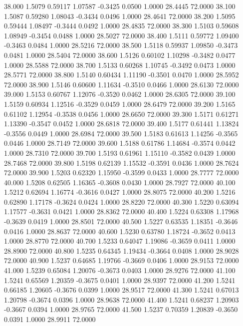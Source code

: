   38.000   1.5079   0.59117   1.07587  -0.3425   0.0500   1.0000  28.4445  72.0000
  38.100   1.5087   0.59280   1.08043  -0.3434   0.0496   1.0000  28.4641  72.0000
  38.200   1.5095   0.59444   1.08497  -0.3444   0.0492   1.0000  28.4835  72.0000
  38.300   1.5103   0.59608   1.08949  -0.3454   0.0488   1.0000  28.5027  72.0000
  38.400   1.5111   0.59772   1.09400  -0.3463   0.0484   1.0000  28.5216  72.0000
  38.500   1.5118   0.59937   1.09850  -0.3473   0.0481   1.0000  28.5404  72.0000
  38.600   1.5126   0.60102   1.10298  -0.3482   0.0477   1.0000  28.5588  72.0000
  38.700   1.5133   0.60268   1.10745  -0.3492   0.0473   1.0000  28.5771  72.0000
  38.800   1.5140   0.60434   1.11190  -0.3501   0.0470   1.0000  28.5952  72.0000
  38.900   1.5146   0.60600   1.11634  -0.3510   0.0466   1.0000  28.6130  72.0000
  39.000   1.5153   0.60767   1.12076  -0.3520   0.0462   1.0000  28.6305  72.0000
  39.100   1.5159   0.60934   1.12516  -0.3529   0.0459   1.0000  28.6479  72.0000
  39.200   1.5165   0.61102   1.12954  -0.3538   0.0456   1.0000  28.6650  72.0000
  39.300   1.5171   0.61271   1.13390  -0.3547   0.0452   1.0000  28.6818  72.0000
  39.400   1.5177   0.61441   1.13824  -0.3556   0.0449   1.0000  28.6984  72.0000
  39.500   1.5183   0.61613   1.14256  -0.3565   0.0446   1.0000  28.7149  72.0000
  39.600   1.5188   0.61786   1.14684  -0.3574   0.0442   1.0000  28.7310  72.0000
  39.700   1.5193   0.61961   1.15110  -0.3582   0.0439   1.0000  28.7468  72.0000
  39.800   1.5198   0.62139   1.15532  -0.3591   0.0436   1.0000  28.7624  72.0000
  39.900   1.5203   0.62320   1.15950  -0.3599   0.0433   1.0000  28.7777  72.0000
  40.000   1.5208   0.62505   1.16365  -0.3608   0.0430   1.0000  28.7927  72.0000
  40.100   1.5212   0.62694   1.16774  -0.3616   0.0427   1.0000  28.8075  72.0000
  40.200   1.5216   0.62890   1.17178  -0.3624   0.0424   1.0000  28.8220  72.0000
  40.300   1.5220   0.63094   1.17577  -0.3631   0.0421   1.0000  28.8362  72.0000
  40.400   1.5224   0.63308   1.17968  -0.3639   0.0419   1.0000  28.8501  72.0000
  40.500   1.5227   0.63535   1.18351  -0.3646   0.0416   1.0000  28.8637  72.0000
  40.600   1.5230   0.63780   1.18724  -0.3652   0.0413   1.0000  28.8770  72.0000
  40.700   1.5233   0.64047   1.19086  -0.3659   0.0411   1.0000  28.8900  72.0000
  40.800   1.5235   0.64345   1.19434  -0.3664   0.0408   1.0000  28.9028  72.0000
  40.900   1.5237   0.64685   1.19766  -0.3669   0.0406   1.0000  28.9153  72.0000
  41.000   1.5239   0.65084   1.20076  -0.3673   0.0403   1.0000  28.9276  72.0000
  41.100   1.5241   0.65569   1.20359  -0.3675   0.0401   1.0000  28.9397  72.0000
  41.200   1.5241   0.66185   1.20605  -0.3676   0.0399   1.0000  28.9517  72.0000
  41.300   1.5241   0.67013   1.20798  -0.3674   0.0396   1.0000  28.9638  72.0000
  41.400   1.5241   0.68237   1.20903  -0.3667   0.0394   1.0000  28.9765  72.0000
  41.500   1.5237   0.70359   1.20839  -0.3650   0.0391   1.0000  28.9911  72.0000
